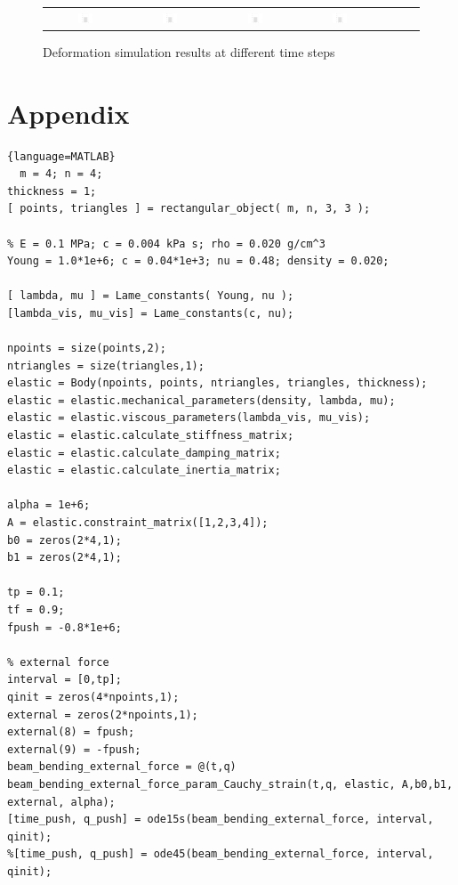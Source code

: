 \documentclass{article}
\begin{document}
\begin{figure}[htbp]
\begin{tabular}{ccccccc}
    \includegraphics[width=0.2\textwidth]{assets/deform_0850.png} &
    \includegraphics[width=0.2\textwidth]{assets/deform_0900.png} & 
    \includegraphics[width=0.2\textwidth]{assets/deform_0950.png} & 
    \includegraphics[width=0.2\textwidth]{assets/deform_1000.png} \\
  \end{tabular}
  \caption{Deformation simulation results at different time steps}
  \label{fig:deformation}
\end{figure}
\section*{Appendix}
\scriptsize
\begin{lstlisting}{language=MATLAB}
  m = 4; n = 4;
thickness = 1;
[ points, triangles ] = rectangular_object( m, n, 3, 3 );

% E = 0.1 MPa; c = 0.004 kPa s; rho = 0.020 g/cm^3
Young = 1.0*1e+6; c = 0.04*1e+3; nu = 0.48; density = 0.020;

[ lambda, mu ] = Lame_constants( Young, nu );
[lambda_vis, mu_vis] = Lame_constants(c, nu);

npoints = size(points,2);
ntriangles = size(triangles,1);
elastic = Body(npoints, points, ntriangles, triangles, thickness);
elastic = elastic.mechanical_parameters(density, lambda, mu);
elastic = elastic.viscous_parameters(lambda_vis, mu_vis);
elastic = elastic.calculate_stiffness_matrix;
elastic = elastic.calculate_damping_matrix;
elastic = elastic.calculate_inertia_matrix;

alpha = 1e+6;
A = elastic.constraint_matrix([1,2,3,4]);
b0 = zeros(2*4,1);
b1 = zeros(2*4,1);

tp = 0.1;
tf = 0.9;
fpush = -0.8*1e+6;
        
% external force
interval = [0,tp];
qinit = zeros(4*npoints,1);
external = zeros(2*npoints,1);
external(8) = fpush;
external(9) = -fpush;
beam_bending_external_force = @(t,q) beam_bending_external_force_param_Cauchy_strain(t,q, elastic, A,b0,b1, external, alpha);
[time_push, q_push] = ode15s(beam_bending_external_force, interval, qinit);
%[time_push, q_push] = ode45(beam_bending_external_force, interval, qinit);

\end{lstlisting}
\end{document}
